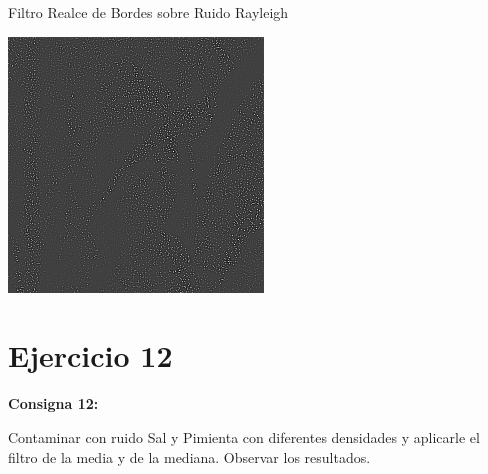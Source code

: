 \documentclass{beamer}
\begin{document}
\begin{frame}[fragile]{Filtro Realce de Bordes sobre Ruido Rayleigh}
\begin{minipage}{0.25\linewidth}
	\end{minipage}\hfill
	\begin{minipage}{0.25\linewidth}
		\centering
		\includegraphics[width=\linewidth]{../results/lena_rayleigh_xi10_bordes}
	\end{minipage}
\end{frame}


\section{Ejercicio 12}

\begin{frame}
	\begin{center}
		\textcolor{unahurverde}{\textbf{Consigna 12:}}
	\end{center}
	\justifying
	
	 Contaminar con ruido Sal y Pimienta con diferentes densidades y aplicarle el filtro de la media y de la mediana. Observar los resultados.
\end{frame}
\end{document}
